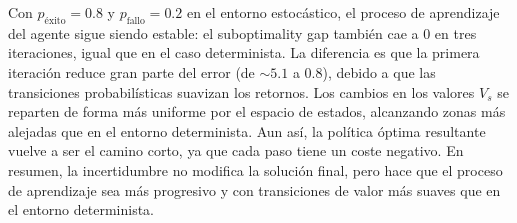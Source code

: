 \documentclass[a4paper,12pt]{article}
\begin{document}
Con $p_\text{éxito}=0.8$ y $p_\text{fallo}=0.2$ en el entorno estocástico, el proceso de aprendizaje del agente sigue siendo estable: el suboptimality gap también cae a 0 en tres iteraciones, igual que en el caso determinista.
La diferencia es que la primera iteración reduce gran parte del error (de $\sim 5.1$ a $0.8$), debido a que las transiciones probabilísticas suavizan los retornos.
Los cambios en los valores $V_s$ se reparten de forma más uniforme por el espacio de estados, alcanzando zonas más alejadas que en el entorno determinista.
Aun así, la política óptima resultante vuelve a ser el camino corto, ya que cada paso tiene un coste negativo.
En resumen, la incertidumbre no modifica la solución final, pero hace que el proceso de aprendizaje sea más progresivo y con transiciones de valor más suaves que en el entorno determinista.
\end{document}
